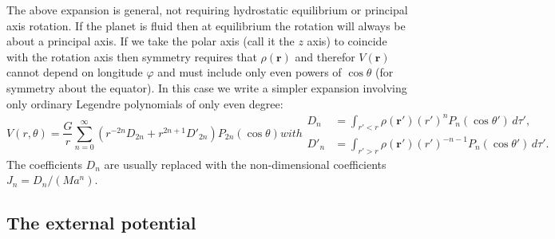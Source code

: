 \documentclass[amsmath,amsfonts,rmp,letterpaper]{revtex4}
\newcommand{\V}[1]{\mathbf{#1}} %
\newcommand{\arr}{\V{r}}
\newcommand{\arp}{\V{r'}}
\begin{document}
The above expansion is general, not requiring hydrostatic equilibrium or principal
axis rotation. If the planet is fluid then at equilibrium the rotation will
always be about a principal axis. If we take the polar axis (call it the $z$ axis)
to coincide with the rotation axis then symmetry requires that $\rho(\arr)$ and
therefor $V(\arr)$ cannot
depend on longitude $\varphi$ and must include only even
powers of $\cos\theta$ (for symmetry about the equator). In this case we write
a simpler expansion involving only ordinary Legendre polynomials of only even
degree:
\begin{subequations}\label{eq:simp_sphe_gravity}
\begin{equation}
V(r,\theta)=\frac{G}{r}\sum_{n=0}^{\infty}\left(r^{-2n}D_{2n} + r^{2n +
1}D'_{2n}\right)P_{2n}(\cos\theta)
\end{equation}
with
\begin{align}
D_n &= \int_{r'<r}\rho(\arp)(r')^nP_n(\cos\theta')\,d\tau',\\
D'_n &= \int_{r'>r}\rho(\arp)(r')^{-n-1}P_n(\cos\theta')\,d\tau'.
\end{align}
\end{subequations}
The coefficients $D_n$ are usually replaced with the non-dimensional coefficients
$J_n=D_n/(Ma^n)$.


\subsection{The external potential}\label{sec:external_potential}
\end{document}
